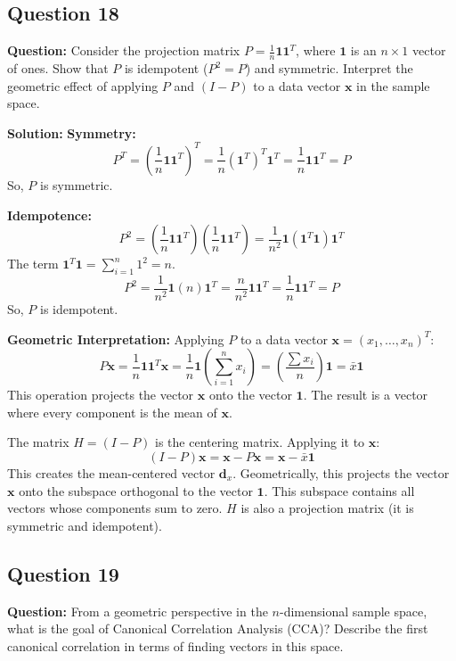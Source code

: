 \subsection*{Question 18}
\textbf{Question:} Consider the projection matrix $P = \frac{1}{n}\mathbf{1}\mathbf{1}^T$, where $\mathbf{1}$ is an $n \times 1$ vector of ones. Show that $P$ is idempotent ($P^2=P$) and symmetric. Interpret the geometric effect of applying $P$ and $(I-P)$ to a data vector $\mathbf{x}$ in the sample space.

\textbf{Solution:}
\textbf{Symmetry:}
$$ P^T = \left(\frac{1}{n}\mathbf{1}\mathbf{1}^T\right)^T = \frac{1}{n}(\mathbf{1}^T)^T\mathbf{1}^T = \frac{1}{n}\mathbf{1}\mathbf{1}^T = P $$
So, $P$ is symmetric.

\textbf{Idempotence:}
$$ P^2 = \left(\frac{1}{n}\mathbf{1}\mathbf{1}^T\right) \left(\frac{1}{n}\mathbf{1}\mathbf{1}^T\right) = \frac{1}{n^2} \mathbf{1}(\mathbf{1}^T\mathbf{1})\mathbf{1}^T $$
The term $\mathbf{1}^T\mathbf{1} = \sum_{i=1}^n 1^2 = n$.
$$ P^2 = \frac{1}{n^2} \mathbf{1}(n)\mathbf{1}^T = \frac{n}{n^2} \mathbf{1}\mathbf{1}^T = \frac{1}{n} \mathbf{1}\mathbf{1}^T = P $$
So, $P$ is idempotent.

\textbf{Geometric Interpretation:}
Applying $P$ to a data vector $\mathbf{x} = (x_1, \dots, x_n)^T$:
$$ P\mathbf{x} = \frac{1}{n}\mathbf{1}\mathbf{1}^T\mathbf{x} = \frac{1}{n}\mathbf{1} \left(\sum_{i=1}^n x_i\right) = \left(\frac{\sum x_i}{n}\right) \mathbf{1} = \bar{x}\mathbf{1} $$
This operation projects the vector $\mathbf{x}$ onto the vector $\mathbf{1}$. The result is a vector where every component is the mean of $\mathbf{x}$.

The matrix $H = (I-P)$ is the centering matrix. Applying it to $\mathbf{x}$:
$$ (I-P)\mathbf{x} = \mathbf{x} - P\mathbf{x} = \mathbf{x} - \bar{x}\mathbf{1} $$
This creates the mean-centered vector $\mathbf{d}_x$. Geometrically, this projects the vector $\mathbf{x}$ onto the subspace orthogonal to the vector $\mathbf{1}$. This subspace contains all vectors whose components sum to zero. $H$ is also a projection matrix (it is symmetric and idempotent).

\subsection*{Question 19}
\textbf{Question:} From a geometric perspective in the $n$-dimensional sample space, what is the goal of Canonical Correlation Analysis (CCA)? Describe the first canonical correlation in terms of finding vectors in this space.

